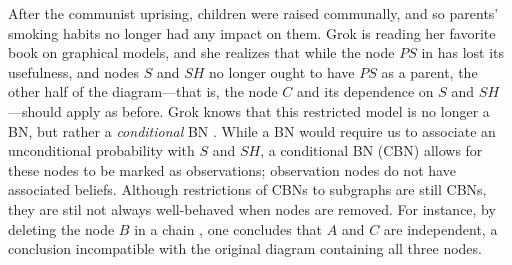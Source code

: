 \documentclass{article}
\numberwithin{equation}{section}
\begin{document}
	\begin{example}[restriction]\label{ex:grok-ablate}
		After the communist uprising, children were raised communally, and so parents' smoking habits no longer had any impact on them. Grok is reading her favorite book on graphical models, and she realizes that while the node $\mathit{PS}$ in  has lost its usefulness, and nodes $S$ and $\mathit{SH}$ no longer ought to have $\mathit{PS}$ as a parent, the other half of the diagram---that is, the node $C$ and its dependence on $S$ and $\mathit{SH}$---should apply as before.
%		
		Grok knows that this restricted model is no longer a
                BN, but rather a \emph{conditional} BN
                \parencite{koller2009probabilistic}. While a BN would
                require us to associate an unconditional probability
                with $S$ and 
                $\mathit{SH}$, a conditional BN (CBN) allows for these
                nodes to be marked as observations; observation nodes
                do not have associated beliefs.  
		Although restrictions of CBNs to subgraphs are still CBNs, they are stil not always well-behaved when nodes are removed. For instance, by deleting the node $B$ in a chain 
		\scalebox{0.6}{
		\begin{tikzcd}[dpad={light pad}, column sep = 1.3em, AmpRep]
			A \ar[r] \& B \ar[r] \& C
		\end{tikzcd}},
		one concludes that $A$ and $C$ are independent, a
                conclusion incompatible with the original diagram
                containing all three nodes.   


\end{example}
\end{document}
